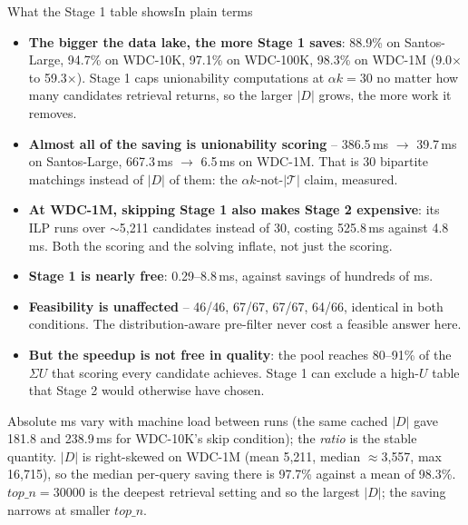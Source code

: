\documentclass[aspectratio=169,10pt]{beamer}
\newcommand{\highlight}[1]{{\color{Cat1}\bfseries #1}}
\begin{document}
\begin{frame}{What the Stage 1 table shows}{In plain terms}
\footnotesize
\begin{itemize}
  \item \highlight{The bigger the data lake, the more Stage 1 saves}: 88.9\% on Santos-Large, 94.7\% on WDC-10K, 97.1\% on WDC-100K, 98.3\% on WDC-1M (9.0$\times$ to 59.3$\times$). Stage 1 caps unionability computations at $\alpha k = 30$ no matter how many candidates retrieval returns, so the larger $|D|$ grows, the more work it removes.
  \item \highlight{Almost all of the saving is unionability scoring} -- 386.5\,ms $\to$ 39.7\,ms on Santos-Large, 667.3\,ms $\to$ 6.5\,ms on WDC-1M. That is 30 bipartite matchings instead of $|D|$ of them: the $\alpha k$-not-$|\mathcal{T}|$ claim, measured.
  \item \highlight{At WDC-1M, skipping Stage 1 also makes Stage 2 expensive}: its ILP runs over $\sim$5{,}211 candidates instead of 30, costing 525.8\,ms against 4.8\,ms. Both the scoring and the solving inflate, not just the scoring.
  \item \highlight{Stage 1 is nearly free}: 0.29--8.8\,ms, against savings of hundreds of ms.
  \item \highlight{Feasibility is unaffected} -- 46/46, 67/67, 67/67, 64/66, identical in both conditions. The distribution-aware pre-filter never cost a feasible answer here.
  \item \highlight{But the speedup is not free in quality}: the pool reaches 80--91\% of the $\Sigma U$ that scoring every candidate achieves. Stage 1 can exclude a high-$U$ table that Stage 2 would otherwise have chosen.
\end{itemize}

\vspace{1pt}
{\footnotesize\color{Muted} Absolute ms vary with machine load between runs (the same cached $|D|$ gave 181.8 and 238.9\,ms for WDC-10K's skip condition); the \emph{ratio} is the stable quantity. $|D|$ is right-skewed on WDC-1M (mean 5{,}211, median $\approx$3{,}557, max 16{,}715), so the median per-query saving there is 97.7\% against a mean of 98.3\%. $top\_n{=}30000$ is the deepest retrieval setting and so the largest $|D|$; the saving narrows at smaller $top\_n$.}
\end{frame}





\end{document}

